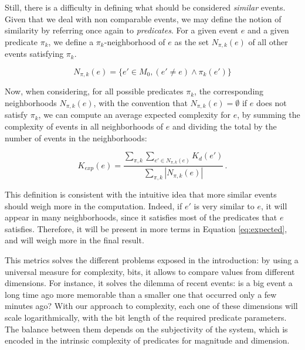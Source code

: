 \documentclass[entropy,article,submit,moreauthors,pdftex]{Definitions/mdpi}
\begin{document}
Still, there is a difficulty in defining what
should be considered \emph{similar} events. Given that we deal with non comparable events, we may define the notion of similarity by referring once again to \emph{predicates}. For a given event $e$ and a given predicate $\pi_k$, we define a $\pi_k$-neighborhood of $e$ as the set $N_{\pi, k}(e)$ of all other events satisfying $\pi_k$.

\begin{equation}
    \label{eq:similar}
    N_{\pi, k}(e) = \{e'\in M_0, (e' \neq e) \wedge \pi_k(e')\}
\end{equation}

Now, when considering, for all possible predicates $\pi_k$, the corresponding
neighborhoods $N_{\pi, k}(e)$, with the convention that $N_{\pi, k}(e) = \emptyset$
if $e$ does not satisfy $\pi_k$, we can compute an average expected complexity for $e$, by summing the complexity of events in all neighborhoods of $e$ and dividing the total by the number of events in the neighborhoods:

\begin{equation}
    \label{eq:expected}
    K_{exp}(e) = \frac{
    \sum_{\pi, k} \sum_{e' \in N_{\pi, k}(e)} K_d(e')
    }{
    \sum_{\pi, k} |N_{\pi, k}(e)|
    }\,.
\end{equation}

This definition is consistent with the intuitive idea that more similar events should weigh more in the computation. Indeed, if $e'$
is very similar to $e$, it will appear in many neighborhoods, since it
satisfies most of the predicates that $e$ satisfies. Therefore, it will
be present in more terms in Equation \ref{eq:expected}, and will weigh more in
the final result.

This metrics solves the different problems exposed in the introduction: by using a universal measure for complexity, bits, it allows to compare values from different dimensions. For instance, it solves the dilemma of recent events: is a big event a long time ago more memorable than a smaller one that occurred only a few minutes ago? With our approach to complexity, each one of these dimensions will scale logarithmically, with the bit length of the required predicate parameters. The balance between them depends on the subjectivity of the system, which is encoded in the intrinsic complexity of predicates for magnitude and dimension. 
\end{document}
